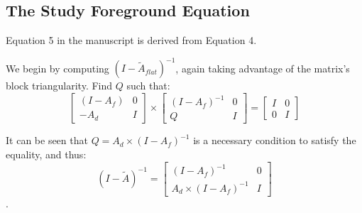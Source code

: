 \subsection{The Study Foreground Equation}

Equation 5 in the manuscript is derived from Equation 4.

We begin by computing $(I-\tilde{A}_{flat})^{-1}$, again taking advantage of the matrix's block triangularity.  Find $Q$ such that:
\begin{equation}
  \left[\begin{array}{cc} (I-A_f) & 0 \\ -A_d & I\end{array}\right]\times
  \left[\begin{array}{cc} (I-A_f)^{-1} & 0 \\ Q & I\end{array}\right] =
  \left[\begin{array}{cc} I & 0 \\ 0 & I\end{array}\right]
\end{equation}

It can be seen that $Q=A_d\times(I-A_f)^{-1}$ is a necessary condition to satisfy the equality, and thus:
\begin{equation}
  (I-\tilde{A})^{-1} = \left[\begin{array}{cc} (I-A_f)^{-1} & 0 \\ A_d\times(I-A_f)^{-1} & I\end{array}\right]
\end{equation}.

